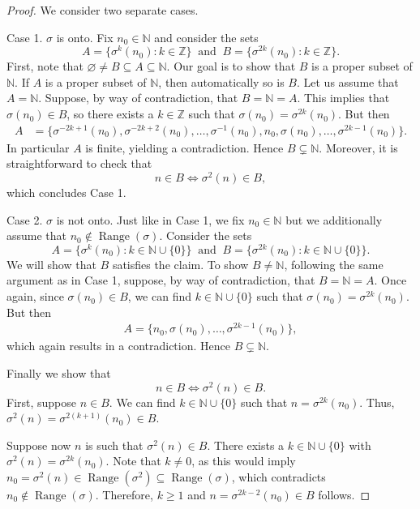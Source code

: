 \documentclass[10pt,a4paper]{amsart}
\newcommand{\N}{\mathbb{N}}
\newcommand{\Z}{\mathbb{Z}}
\begin{document}
\begin{proof}
We consider two separate cases.

Case 1. $\sigma$ is onto. Fix $n_0 \in \N$ and consider the sets
$$A = \{\sigma^k(n_0): k\in \Z\} ~\text{ and } ~B = \{\sigma^{2k}(n_0): k \in \Z\}.$$
First, note that $\varnothing \neq B \subseteq A \subseteq \N$. Our goal is to show that $B$ is a proper subset of $\N$. If $A$ is a proper subset of $\N$, then automatically so is $B$. Let us assume that $A=\N$. Suppose, by way of contradiction, that $B=\N=A$. This implies that $\sigma(n_0) \in B$, so there exists a $k\in \Z$ such that $\sigma(n_0) = \sigma^{2k}(n_0)$. But then
\begin{align*}
A &= \{\sigma^{-2k+1}(n_0),\sigma^{-2k+2}(n_0),\dots,\sigma^{-1}(n_0),n_0, \sigma(n_0),\dots,\sigma^{2k-1}(n_0)\}. 
\end{align*}
In particular $A$ is finite, yielding a contradiction. Hence $B\subsetneq\N$. Moreover, it is straightforward to check that 
$$n \in B \iff \sigma^2(n)\in B,$$
which concludes Case 1.

Case 2. $\sigma$ is not onto. Just like in Case 1, we fix $n_0 \in \N$ but we additionally assume that $n_0\notin \operatorname{Range} (\sigma)$. Consider the sets 
$$A = \{\sigma^k(n_0): k\in \N\cup\{0\}\} ~\text{ and } ~B = \{\sigma^{2k}(n_0): k \in \N\cup \{0\}\}.$$
We will show that $B$ satisfies the claim. To show $B\neq \N$, following the same argument as in Case 1, suppose, by way of contradiction, that $B=\N=A$. Once again, since $\sigma(n_0) \in B$, we can find $k\in \N\cup \{0\}$ such that $\sigma(n_0) = \sigma^{2k}(n_0)$. But then
\begin{align*}
A =\{n_0,\sigma(n_0),\dots,\sigma^{2k-1}(n_0)\},
\end{align*}
which again results in a contradiction. Hence $B\subsetneq\N$. 

Finally we show that
$$n \in B \iff \sigma^2(n)\in B.$$ 
First, suppose $n\in B$. We can find $k\in \N\cup\{0\}$ such that
$n=\sigma^{2k}(n_0)$. Thus, $\sigma^2(n)=\sigma^{2(k+1)}(n_0) \in B$. 

Suppose now $n$ is such that $\sigma^2(n) \in B$. There exists a $k \in \N\cup\{0\}$ with $\sigma^2(n)=\sigma^{2k}(n_0)$. Note that $k\neq 0$, as this would imply $n_0=\sigma^2(n)\in \operatorname{Range}(\sigma^2) \subseteq \operatorname{Range}( \sigma)$, which contradicts $n_0 \notin \operatorname{Range}(\sigma)$. Therefore, $k\geq 1$ and $n=\sigma^{2k-2}(n_0) \in B$ follows.
\end{proof}
\end{document}
